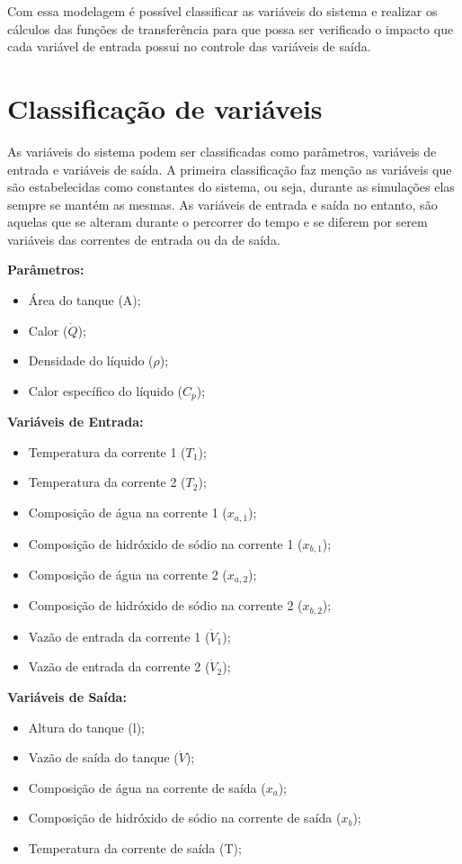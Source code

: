 \documentclass[
	12pt,				%
	openright,			%
	oneside,			%
	a4paper,			%
	english,			%
	french,				%
	spanish,			%
	brazil				%
	]{abntex2}
\begin{document}
Com essa modelagem é possível classificar as variáveis do sistema e realizar os cálculos das funções de transferência para que possa ser verificado o impacto que cada variável de entrada possui no controle das variáveis de saída.

\newpage
\chapter{Classificação de variáveis}
\pagestyle{fancy}

As variáveis do sistema podem ser classificadas como parâmetros, variáveis de entrada e variáveis de saída. A primeira classificação faz menção as variáveis que são estabelecidas como constantes do sistema, ou seja, durante as simulações elas sempre se mantém as mesmas. As variáveis de entrada e saída no entanto, são aquelas que se alteram durante o percorrer do tempo e se diferem por serem variáveis das correntes de entrada ou da de saída.

\textbf{Parâmetros:}
\begin{itemize}
\item Área do tanque (A);
\item Calor ($\dot{Q}$);
\item Densidade do líquido ($\rho$);
\item Calor específico do líquido ($C_{p}$);
\end{itemize}

\textbf{Variáveis de Entrada:}
\begin{itemize}
\item Temperatura da corrente 1 ($T_{1}$);
\item Temperatura da corrente 2 ($T_{2}$);
\item Composição de água na corrente 1 ($x_{a,1}$);
\item Composição de hidróxido de sódio na corrente 1 ($x_{b,1}$);
\item Composição de água na corrente 2 ($x_{a,2}$);
\item Composição de hidróxido de sódio na corrente 2 ($x_{b,2}$);
\item Vazão de entrada da corrente 1 ($\dot{V}_{1}$);
\item Vazão de entrada da corrente 2 ($\dot{V}_{2}$);
\end{itemize}

\textbf{Variáveis de Saída:}
\begin{itemize}
\item Altura do tanque (l);
\item Vazão de saída do tanque ($\dot{V}$);
\item Composição de água na corrente de saída ($x_{a}$);
\item Composição de hidróxido de sódio na corrente de saída ($x_{b}$);
\item Temperatura da corrente de saída (T);
\end{itemize}
\end{document}
